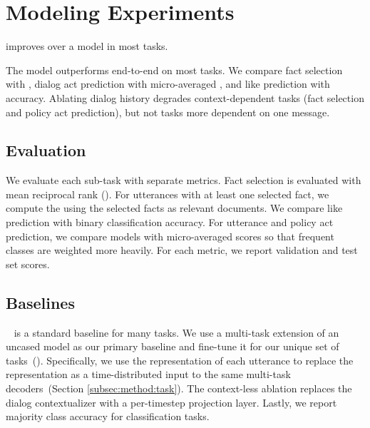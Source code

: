 \section{Modeling Experiments}
\label{sec:exp}

\charm{} improves over a \bert{} model in most tasks.

\begin{table*}[t]
    \small
    \centering
    \caption{
        The \charm{} model outperforms end-to-end \bert{} on most tasks.
        We compare fact selection with \mrr{}, dialog act prediction with micro-averaged \fone{}, and like prediction with accuracy.
        Ablating dialog history degrades context-dependent tasks (fact selection and policy act prediction), but not tasks more dependent on one message.
    }
    \label{tab:experiments}
\end{table*}

\subsection{Evaluation}
We evaluate each sub-task with separate metrics.
Fact selection is evaluated with mean reciprocal rank (\mrr{}).
For utterances with at least one selected fact, we compute the \mrr{} using the selected facts as relevant documents.
We compare like prediction with binary classification accuracy.
For utterance and policy act prediction, we compare models with micro-averaged \fone{} scores so that frequent classes are weighted more heavily.
For each metric, we report validation and test set scores.

\subsection{Baselines}
\bert{}~\citep{Devlin2018BERTPO} is a standard baseline for many  tasks.
We use a multi-task extension of an uncased \bert{} model as our primary baseline and fine-tune it for our unique set of tasks~(\mtbert).
Specifically, we use the  representation of each utterance to replace the \hre{} representation as a time-distributed input to the same multi-task decoders~(Section \ref{subsec:method:task}).
The context-less \charm{} ablation replaces the dialog contextualizer  with a per-timestep projection layer.
Lastly, we report majority class accuracy for classification tasks.

